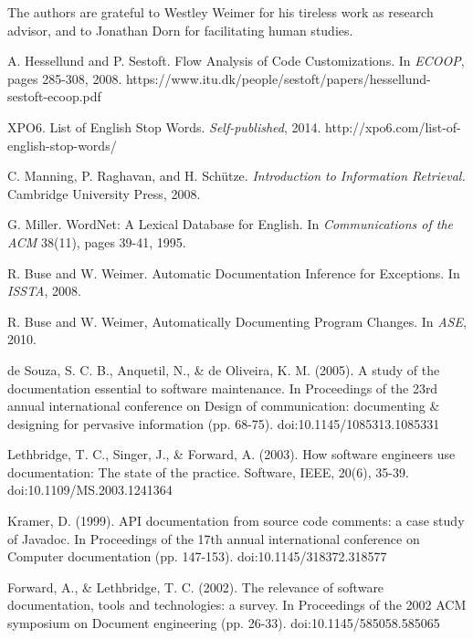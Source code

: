 \documentclass[preprint]{sigplanconf}
\begin{document}
The authors are grateful to Westley Weimer for his tireless work as research advisor, and to Jonathan Dorn for facilitating human studies.





\begin{thebibliography}{}
\softraggedright

A. Hessellund and P. Sestoft. Flow Analysis of Code Customizations. In \emph{ECOOP}, pages 285-308, 2008.
https://www.itu.dk/people/sestoft/papers/hessellund-sestoft-ecoop.pdf

XPO6. List of English Stop Words. \emph{Self-published}, 2014.
http://xpo6.com/list-of-english-stop-words/

C. Manning, P. Raghavan, and H. Schütze. \emph{Introduction to Information Retrieval.} Cambridge University Press, 2008.

G. Miller. WordNet: A Lexical Database for English. In \emph{Communications of the ACM} 38(11), pages 39-41, 1995.

R. Buse and W. Weimer. Automatic Documentation Inference for Exceptions. In \emph{ISSTA}, 2008.

R. Buse and W. Weimer, Automatically Documenting Program Changes. In \emph{ASE}, 2010.

de Souza, S. C. B., Anquetil, N., \& de Oliveira, K. M. (2005). A study of the documentation essential to software maintenance. In Proceedings of the 23rd annual international conference on Design of communication: documenting \& designing for pervasive information (pp. 68-75). doi:10.1145/1085313.1085331

Lethbridge, T. C., Singer, J., \& Forward, A. (2003). How software engineers use documentation: The state of the practice. Software, IEEE, 20(6), 35-39. doi:10.1109/MS.2003.1241364

Kramer, D. (1999). API documentation from source code comments: a case study of Javadoc. In Proceedings of the 17th annual international conference on Computer documentation (pp. 147-153). doi:10.1145/318372.318577

Forward, A., \& Lethbridge, T. C. (2002). The relevance of software documentation, tools and technologies: a survey. In Proceedings of the 2002 ACM symposium on Document engineering (pp. 26-33). doi:10.1145/585058.585065

\end{thebibliography}
\end{document}
